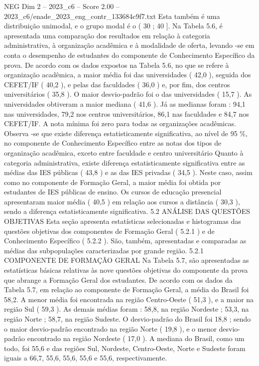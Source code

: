 \begin{textsample}{NEG Dim 2 – 2023\_c6 – Score 2.00 – 2023\_c6/enade\_2023\_eng\_contr\_133684c9f7.txt}
Esta também é uma distribuição unimodal, e o grupo modal é o ( 30 ; 40 ].
Na Tabela 5.6, é apresentada uma comparação dos resultados em relação à categoria administrativa, à organização acadêmica e à modalidade de oferta, levando -se em conta o desempenho de estudantes do componente de Conhecimento Específico da prova.
De acordo com os dados expostos na Tabela 5.6, no que se refere à organização acadêmica, a maior média foi das universidades ( 42,0 ), seguida dos CEFET/IF ( 40,2 ), e pelas das faculdades ( 36,0 ) e, por fim, dos centros universitários ( 35,8 ).
O maior desvio-padrão foi o das universidades ( 15,7 ).
As universidades obtiveram a maior mediana ( 41,6 ).
Já as medianas foram : 94,1 nas universidades, 79,2 nos centros universitários, 86,1 nas faculdades e 84,7 nos CEFET/IF.
A nota mínima foi zero para todas as organizações acadêmicas.
Observa -se que existe diferença estatisticamente significativa, ao nível de 95 \%, no componente de Conhecimento Específico entre as notas dos tipos de organização acadêmica, exceto entre faculdade e centro universitário Quanto à categoria administrativa, existe diferença estatisticamente significativa entre as médias das IES públicas ( 43,8 ) e as das IES privadas ( 34,5 ).
Neste caso, assim como no componente de Formação Geral, a maior média foi obtida por estudantes de IES públicas de ensino.
Os cursos de educação presencial apresentaram maior média ( 40,5 ) em relação aos cursos a distância ( 30,3 ), sendo a diferença estatisticamente significativa. 5.2 ANÁLISE DAS QUESTÕES OBJETIVAS Esta seção apresenta estatísticas selecionadas e histogramas das questões objetivas dos componentes de Formação Geral ( 5.2.1 ) e de Conhecimento Específico ( 5.2.2 ).
São, também, apresentadas e comparadas as médias das subpopulações caracterizadas por grande região. 5.2.1 COMPONENTE DE FORMAÇÃO GERAL Na Tabela 5.7, são apresentadas as estatísticas básicas relativas às nove questões objetivas do componente da prova que abrange a Formação Geral dos estudantes.
De acordo com os dados da Tabela 5.7, em relação ao componente de Formação Geral, a média do Brasil foi 58,2.
A menor média foi encontrada na região Centro-Oeste ( 51,3 ), e a maior na região Sul ( 59,3 ).
As demais médias foram : 58,8, na região Nordeste ; 53,3, na região Norte ; 58,7, na região Sudeste.
O desvio-padrão do Brasil foi 18,8 ; sendo o maior desvio-padrão encontrado na região Norte ( 19,8 ), e o menor desvio-padrão encontrado na região Nordeste ( 17,0 ).
A mediana do Brasil, como um todo, foi 55,6 e das regiões Sul, Nordeste, Centro-Oeste, Norte e Sudeste foram iguais a 66,7, 55,6, 55,6, 55,6 e 55,6, respectivamente.

\end{textsample}
